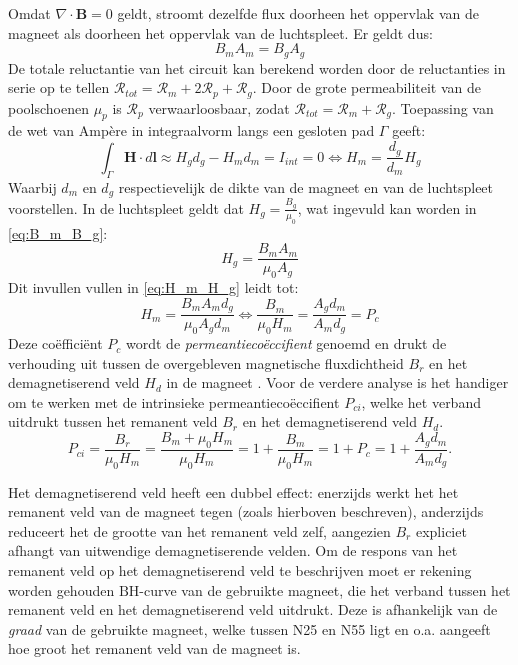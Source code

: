 \documentclass[we,twoside,openright,a4paper,11pt]{uantwerpenbamathesis}
\begin{document}
Omdat $\nabla \cdot \mathbf{B}=0$ geldt, stroomt dezelfde flux doorheen het oppervlak van de magneet als doorheen het oppervlak van de luchtspleet. Er geldt dus:
\begin{equation}\label{eq:B_m_B_g}
    B_m A_m = B_g A_g
\end{equation}
De totale reluctantie van het circuit kan berekend worden door de reluctanties in serie op te tellen $\mathcal{R}_{tot}=\mathcal{R}_{m}+2\mathcal{R}_{p}+\mathcal{R}_{g}$. Door de grote permeabiliteit van de poolschoenen $\mu_p$ is $\mathcal{R}_{p}$ verwaarloosbaar, zodat $\mathcal{R}_{tot}=\mathcal{R}_{m}+\mathcal{R}_{g}$. Toepassing van de wet van Ampère in integraalvorm langs een gesloten pad $\Gamma$ geeft:
\begin{equation}\label{eq:H_m_H_g}
    \int_\Gamma \mathbf{H}\cdot d\mathbf{l} \approx H_g d_g - H_m d_m = I_{int}=0 \Leftrightarrow H_m = \frac{d_g}{d_m}H_g
\end{equation}
Waarbij $d_m$ en $d_g$ respectievelijk de dikte van de magneet en van de luchtspleet voorstellen. In de luchtspleet geldt dat $H_g = \frac{B_g}{\mu_0}$, wat ingevuld kan worden in \ref{eq:B_m_B_g}:
\begin{equation}
    H_g = \frac{B_m A_m}{\mu_0 A_g}
\end{equation}
Dit invullen vullen in \ref{eq:H_m_H_g} leidt tot:
\begin{equation}
    H_m = \frac{B_m A_m d_g}{\mu_0 A_g d_m} \Leftrightarrow \frac{B_m}{\mu_0 H_m} = \frac{A_g d_m}{A_m d_g} = P_c
\end{equation}
Deze coëfficiënt $P_c$ wordt de \textit{permeantiecoëccifient} genoemd en drukt de verhouding uit tussen de overgebleven magnetische fluxdichtheid $B_r$ en het demagnetiserend veld $H_d$ in de magneet \cite{mmpa_permanent_magnet_guidelines}. Voor de verdere analyse is het handiger om te werken met de intrinsieke permeantiecoëccifient $P_{ci}$, welke het verband uitdrukt tussen het remanent veld $B_r$ en het demagnetiserend veld $H_d$.
\begin{equation}\label{eq:Pci}
    P_{ci}=\frac{B_r}{\mu_0 H_m}=\frac{B_m+\mu_0 H_m}{\mu_0 H_m}=1+\frac{B_m}{\mu_0 H_m}=1+P_c = 1+\frac{A_g d_m}{A_m d_g}. 
\end{equation}

Het demagnetiserend veld heeft een dubbel effect: enerzijds werkt het het remanent veld van de magneet tegen (zoals hierboven beschreven), anderzijds reduceert het de grootte van het remanent veld zelf, aangezien $B_r$ expliciet afhangt van uitwendige demagnetiserende velden. Om de respons van het remanent veld op het demagnetiserend veld te beschrijven moet er rekening worden gehouden $\mathrm{BH}$-curve van de gebruikte magneet, die het verband tussen het remanent veld en het demagnetiserend veld uitdrukt. Deze is afhankelijk van de \textit{graad} van de gebruikte magneet, welke tussen N25 en N55 ligt en o.a. aangeeft hoe groot het remanent veld van de magneet is.\\
\end{document}
